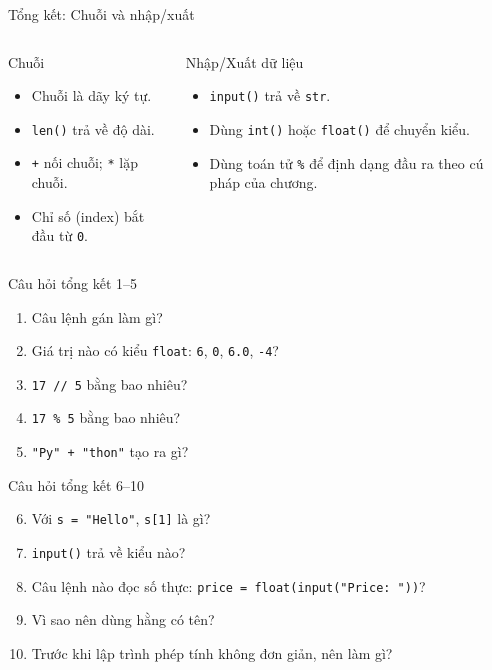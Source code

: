 \documentclass[aspectratio=169,10pt]{beamer}
\begin{document}
\begin{frame}{Tổng kết: Chuỗi và nhập/xuất}
\begin{columns}[T,onlytextwidth]
\begin{block}{Chuỗi}
\small
\begin{itemize}
  \item Chuỗi là dãy ký tự.
  \item \texttt{len()} trả về độ dài.
  \item \texttt{+} nối chuỗi; \texttt{*} lặp chuỗi.
  \item Chỉ số (index) bắt đầu từ \texttt{0}.
\end{itemize}
\end{block}
\begin{block}{Nhập/Xuất dữ liệu}
\small
\begin{itemize}
  \item \texttt{input()} trả về \texttt{str}.
  \item Dùng \texttt{int()} hoặc \texttt{float()} để chuyển kiểu.
  \item Dùng toán tử \texttt{\%} để định dạng đầu ra theo cú pháp của chương.
\end{itemize}
\end{block}
\end{columns}
\end{frame}

\begin{frame}{Câu hỏi tổng kết 1--5}
\small
\begin{enumerate}
  \item Câu lệnh gán làm gì?
  \item Giá trị nào có kiểu \texttt{float}: \texttt{6}, \texttt{0}, \texttt{6.0}, \texttt{-4}?
  \item \texttt{17 // 5} bằng bao nhiêu?
  \item \texttt{17 \% 5} bằng bao nhiêu?
  \item \texttt{"Py" + "thon"} tạo ra gì?
\end{enumerate}
\end{frame}

\begin{frame}{Câu hỏi tổng kết 6--10}
\small
\begin{enumerate}
  \setcounter{enumi}{5}
  \item Với \texttt{s = "Hello"}, \texttt{s[1]} là gì?
  \item \texttt{input()} trả về kiểu nào?
  \item Câu lệnh nào đọc số thực: \texttt{price = float(input("Price: "))}?
  \item Vì sao nên dùng hằng có tên?
  \item Trước khi lập trình phép tính không đơn giản, nên làm gì?
\end{enumerate}
\end{frame}
\end{document}
